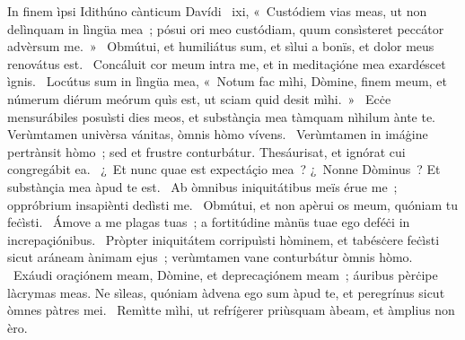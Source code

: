{ In finem ìpsi Idithúno cànticum Davídi}
{%
~ixi, «~Custódiem vias meas, ut non delìnquam in lìngüa mea~; pósui ori meo custódiam, quum consìsteret peccátor advèrsum me.~»
~Obmútui, et humiliátus sum, et sìlui a bonïs, et dolor meus renovátus est. 
~Concáluit cor meum intra me, et in meditaçióne mea exardéscet ìgnis. 
~Locútus sum in lìngüa mea, «~Notum fac mìhi, Dòmine, finem meum, et númerum diérum meórum quìs est, ut sciam quid desit mìhi.~»
~Ecċe mensurábiles posuìsti dies meos, et substànçia mea tàmquam nìhilum ànte te. Verùmtamen univèrsa vánitas, òmnis hòmo vívens. 
~Verùmtamen in imáġine pertrànsit hòmo~; sed et frustre conturbátur. Thesáurisat, et ignórat cui congregábit ea. 
~¿~Et nunc quae est expectáçio mea~? ¿~Nonne Dòminus~? Et substànçia mea àpud te est. 
~Ab òmnibus iniquitátibus meïs érue me~; oppróbrium insapiènti dedìsti me. 
~Obmútui, et non apèrui os meum, quóniam tu feċìsti. 
~Ámove a me plagas tuas~; a fortitúdine mànüs tuae ego deféċi in increpaçiónibus. 
~Pròpter iniquitátem corripuìsti hòminem, et tabésċere feċìsti sicut aráneam ànimam ejus~; verùmtamen vane conturbátur òmnis hòmo. 
~Exáudi oraçiónem meam, Dòmine, et deprecaçiónem meam~; áuribus pèrċipe làcrymas meas. Ne sìleas, quóniam àdvena ego sum àpud te, et peregrínus sicut òmnes pàtres mei. 
~Remìtte mìhi, ut refríġerer priùsquam àbeam, et àmplius non èro. 
}
